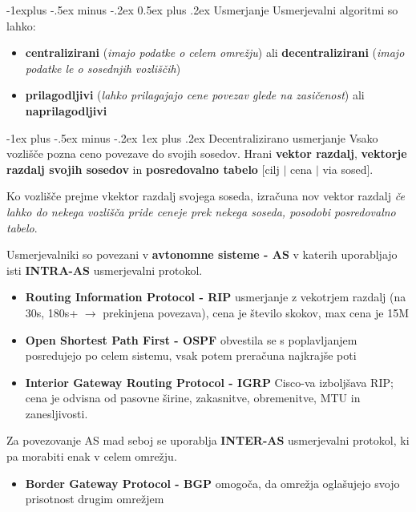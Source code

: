 \documentclass[a4paper,8pt]{extarticle}
\makeatletter
\renewcommand{\subsection}{\@startsection{subsection}{2}{0mm}%
                                {-1explus -.5ex minus -.2ex}%
                                {0.5ex plus .2ex}%
                                {\normalfont\normalsize\bfseries}}
\renewcommand{\subsubsection}{\@startsection{subsubsection}{3}{0mm}%
                                {-1ex plus -.5ex minus -.2ex}%
                                {1ex plus .2ex}%
                                {\normalfont\small\bfseries}}
\makeatother
\begin{document}
\begin{multicols}{4}
\subsection{Usmerjanje}
Usmerjevalni algoritmi so lahko: 
\begin{itemize}
	\item \textbf{centralizirani} (\emph{imajo podatke o celem omrežju}) ali \textbf{decentralizirani} (\emph{imajo podatke le o sosednjih vozliščih}) \\
	\item \textbf{prilagodljivi} (\emph{lahko prilagajajo cene povezav glede na zasičenost}) ali \textbf{naprilagodljivi}
\end{itemize}

\subsubsection{Decentralizirano usmerjanje}
Vsako vozlišče pozna ceno povezave do svojih sosedov. Hrani \textbf{vektor razdalj}, \textbf{vektorje razdalj svojih sosedov} in \textbf{posredovalno tabelo} [cilj $\vert$ cena $\vert$ via sosed].

Ko vozlišče prejme vkektor razdalj svojega soseda, izračuna nov vektor razdalj \emph{če lahko do nekega vozlišča pride ceneje prek nekega soseda, posodobi posredovalno tabelo}.

Usmerjevalniki so povezani v \textbf{avtonomne sisteme - AS} v katerih uporabljajo isti \textbf{INTRA-AS} usmerjevalni protokol.
\begin{itemize}
	\item \textbf{Routing Information Protocol - RIP} usmerjanje z vekotrjem razdalj (na 30s, 180s+ $\rightarrow$ prekinjena povezava), cena je število skokov, max cena je 15M
	\item \textbf{Open Shortest Path First - OSPF} obvestila se s poplavljanjem posredujejo po celem sistemu, vsak potem preračuna najkrajše poti
	\item \textbf{Interior Gateway Routing Protocol - IGRP} Cisco-va izboljšava RIP; cena je odvisna od pasovne širine, zakasnitve, obremenitve, MTU in zanesljivosti.
\end{itemize}

Za povezovanje AS mad seboj se uporablja \textbf{INTER-AS} usmerjevalni protokol, ki pa morabiti enak v celem omrežju.
\begin{itemize}
	\item \textbf{Border Gateway Protocol - BGP} omogoča, da omrežja oglašujejo svojo prisotnost drugim omrežjem
\end{itemize}
\columnbreak
\begin{center}
	

\end{center}
\end{multicols}
\end{document}
